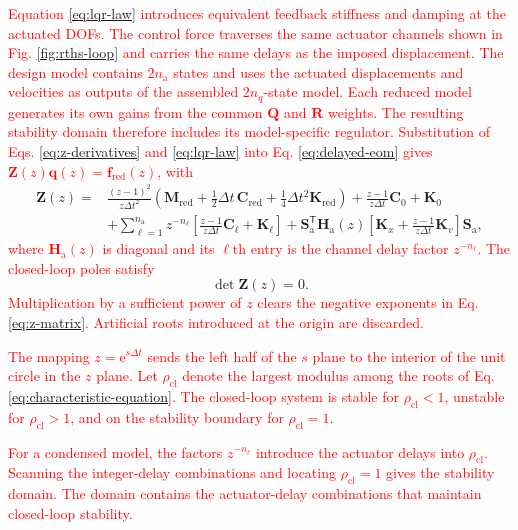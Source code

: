 \documentclass[11pt,a4paper]{article}
\numberwithin{equation}{section}
\newcommand{\rev}[1]{\textcolor{red}{#1}}
\begin{document}
\rev{Equation \eqref{eq:lqr-law} introduces equivalent feedback stiffness and damping at the actuated DOFs. The control force traverses the same actuator channels shown in Fig. \ref{fig:rths-loop} and carries the same delays as the imposed displacement. The design model contains \(2n_{\mathrm{a}}\) states and uses the actuated displacements and velocities as outputs of the assembled \(2n_{q}\)-state model. Each reduced model generates its own gains from the common \(\mathbf{Q}\) and \(\mathbf{R}\) weights. The resulting stability domain therefore includes its model-specific regulator.}
\rev{Substitution of Eqs. \eqref{eq:z-derivatives} and \eqref{eq:lqr-law} into Eq. \eqref{eq:delayed-eom} gives \(\mathbf{Z}(z)\bm{q}(z)=\bm{f}_{\mathrm{red}}(z)\), with}
\begin{equation}
	\begin{aligned}
		\mathbf{Z}(z)={}&
		\frac{(z-1)^{2}}{z\Delta t^{2}}
		\left(\mathbf{M}_{\mathrm{red}}
		+\tfrac{1}{2}\Delta t\,\mathbf{C}_{\mathrm{red}}
		+\tfrac{1}{4}\Delta t^{2}\mathbf{K}_{\mathrm{red}}\right)
		+\frac{z-1}{z\Delta t}\mathbf{C}_{0}+\mathbf{K}_{0}\\
		&+\sum_{\ell=1}^{n_{\mathrm{a}}}z^{-n_{\ell}}
		\left[
		\frac{z-1}{z\Delta t}\mathbf{C}_{\ell}+\mathbf{K}_{\ell}
		\right]
		+\mathbf{S}_{\mathrm{a}}^{\mathsf{T}}\mathbf{H}_{\mathrm{a}}(z)
		\left[
		\mathbf{K}_{x}+\frac{z-1}{z\Delta t}\mathbf{K}_{v}
		\right]\mathbf{S}_{\mathrm{a}},
	\end{aligned}
	\label{eq:z-matrix}
\end{equation}
\rev{where \(\mathbf{H}_{\mathrm{a}}(z)\) is diagonal and its \(\ell\)th entry is the channel delay factor \(z^{-n_{\ell}}\). The closed-loop poles satisfy}
\begin{equation}
	\det\mathbf{Z}(z)=0.
	\label{eq:characteristic-equation}
\end{equation}
\rev{Multiplication by a sufficient power of \(z\) clears the negative exponents in Eq. \eqref{eq:z-matrix}. Artificial roots introduced at the origin are discarded.}

\rev{The mapping \(z=\mathrm{e}^{s\Delta t}\) sends the left half of the \(s\) plane to the interior of the unit circle in the \(z\) plane. Let \(\rho_{\mathrm{cl}}\) denote the largest modulus among the roots of Eq. \eqref{eq:characteristic-equation}. The closed-loop system is stable for \(\rho_{\mathrm{cl}}<1\), unstable for \(\rho_{\mathrm{cl}}>1\), and on the stability boundary for \(\rho_{\mathrm{cl}}=1\).}

\rev{For a condensed model, the factors \(z^{-n_{\ell}}\) introduce the actuator delays into \(\rho_{\mathrm{cl}}\). Scanning the integer-delay combinations and locating \(\rho_{\mathrm{cl}}=1\) gives the stability domain. The domain contains the actuator-delay combinations that maintain closed-loop stability.}
\end{document}
